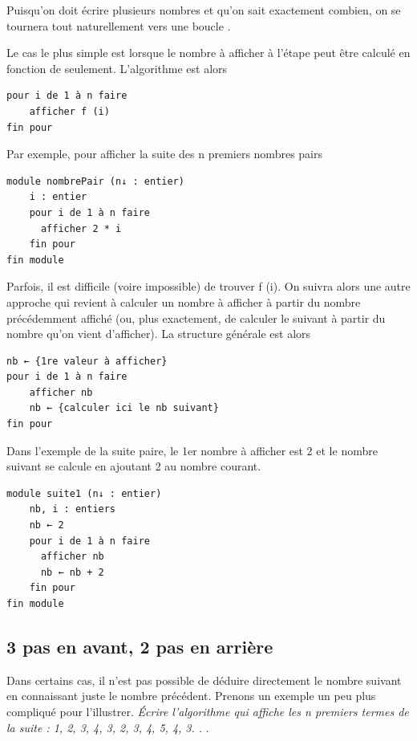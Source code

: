 \documentclass[11pt,a4paper]{article}
\begin{document}
            \par
        
        Puisqu'on doit \'ecrire plusieurs nombres et qu'on sait exactement combien, 
        on se tournera tout naturellement vers une boucle \verb@pour@.
      
            \par
        
        Le cas le plus simple est lorsque le nombre \`a afficher \`a l'\'etape \verb@i@ 
        peut \^etre calcul\'e en fonction de \verb@i@ seulement. L'algorithme est alors
      
            \par
        \begin{verbatim}
pour i de 1 à n faire
    afficher f (i)
fin pour
      \end{verbatim}Par exemple, pour afficher la suite des n premiers nombres pairs
            \par
        \begin{verbatim}
module nombrePair (n↓ : entier)
    i : entier
    pour i de 1 à n faire
      afficher 2 * i
    fin pour
fin module
      \end{verbatim}
        Parfois, il est difficile (voire impossible) de trouver f (i). On suivra alors une autre approche
        qui revient \`a calculer un nombre \`a afficher \`a partir du nombre pr\'ec\'edemment affich\'e (ou, plus
        exactement, de calculer le suivant \`a partir du nombre qu'on vient d'afficher). La structure
        g\'en\'erale est alors
      
            \par
        \begin{verbatim}
nb ← {1re valeur à afficher}
pour i de 1 à n faire
    afficher nb
    nb ← {calculer ici le nb suivant}
fin pour
      \end{verbatim}
        Dans l'exemple de la suite paire, le 1er nombre \`a afficher est 
        2 et le nombre suivant se calcule en ajoutant 2 au nombre courant.
      
            \par
        \begin{verbatim}
module suite1 (n↓ : entier)
    nb, i : entiers
    nb ← 2
    pour i de 1 à n faire
      afficher nb
      nb ← nb + 2
    fin pour
fin module
      \end{verbatim}\subsection{3 pas en avant, 2 pas en arri\`ere}
		    Dans certains cas, il n'est pas possible de d\'eduire directement le nombre suivant en connaissant juste le nombre pr\'ec\'edent. 
		    Prenons un exemple un peu plus compliqu\'e pour l'illustrer.
		    \guillemotleft  \textit{\'Ecrire l'algorithme qui affiche les n premiers termes de la suite : 1, 2, 3, 4, 3, 2, 3, 4, 5, 4, 3. . }. \guillemotright 
      
\end{document}
